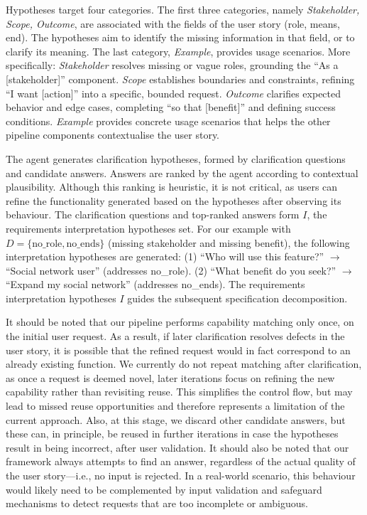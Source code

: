 \documentclass[sigconf,screen]{acmart}
\begin{document}
Hypotheses target four categories. The first three categories, namely \textit{Stakeholder, Scope, Outcome}, are associated with the fields of the user story (role, means, end). The hypotheses aim to identify the missing information in that field, or to clarify its meaning. The last category, \textit{Example}, provides usage scenarios. More specifically:
\textit{Stakeholder} resolves missing or vague roles, grounding the ``As a [stakeholder]'' component. \textit{Scope} establishes boundaries and constraints, refining ``I want [action]'' into a specific, bounded request. \textit{Outcome} clarifies expected behavior and edge cases, completing ``so that [benefit]'' and defining success conditions. \textit{Example} provides concrete usage scenarios that helps the other pipeline components contextualise the user story.

The agent generates clarification  hypotheses, formed by clarification questions and candidate answers. Answers are ranked by the agent according to contextual plausibility. Although this ranking is heuristic, it is not critical, as users can refine the functionality generated based on the hypotheses after observing its behaviour.
The clarification questions and top-ranked answers form $I$, the requirements interpretation hypotheses set.
For our example with $D = \{\text{no\_role}, \text{no\_ends}\}$ (missing stakeholder and missing benefit), the following interpretation hypotheses are generated: (1) ``Who will use this feature?'' $\rightarrow$ ``Social network user'' (addresses no\_role). (2) ``What benefit do you seek?'' $\rightarrow$ ``Expand my social network'' (addresses no\_ends). The requirements interpretation hypotheses $I$ guides the subsequent specification decomposition.

It should be noted that our pipeline performs capability matching only once, on the initial user request. As a result, if later clarification resolves defects in the user story, it is possible that the refined request would in fact correspond to an already existing function. We currently do not repeat matching after clarification, as once a request is deemed novel, later iterations focus on refining the new capability rather than revisiting reuse. This simplifies the control flow, but may lead to missed reuse opportunities and therefore represents a limitation of the current approach. Also, at this stage, we discard other candidate answers, but these can, in principle, be reused in further iterations in case the hypotheses result in being incorrect, after user validation. It should also be noted that our framework always attempts to find an answer, regardless of the actual quality of the user story---i.e., no input is rejected. In a real-world scenario, this behaviour would likely need to be complemented by input validation and safeguard mechanisms to detect requests that are too incomplete or ambiguous.
\end{document}
